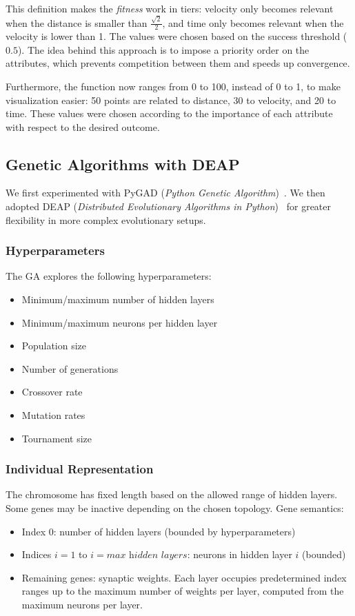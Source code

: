 \documentclass[12pt]{article}
\theoremstyle{definition}
\begin{document}
This definition makes the \textit{fitness} work in tiers: velocity only becomes relevant when the distance is smaller than $\frac{\sqrt{2}}{2}$, and time only becomes relevant when the velocity is lower than 1. The values were chosen based on the success threshold ($0.5$). The idea behind this approach is to impose a priority order on the attributes, which prevents competition between them and speeds up convergence.

Furthermore, the function now ranges from 0 to 100, instead of 0 to 1, to make visualization easier: 50 points are related to distance, 30 to velocity, and 20 to time. These values were chosen according to the importance of each attribute with respect to the desired outcome.

\subsection{Genetic Algorithms with DEAP}
We first experimented with PyGAD (\textit{Python Genetic Algorithm})~\cite{DBLP:journals/corr/abs-2106-06158}. We then adopted DEAP (\textit{Distributed Evolutionary Algorithms in Python})~\cite{DEAP_JMLR2012} for greater flexibility in more complex evolutionary setups.

\subsubsection{Hyperparameters}
The GA explores the following hyperparameters:
\begin{itemize}
    \item Minimum/maximum number of hidden layers
    \item Minimum/maximum neurons per hidden layer
    \item Population size
    \item Number of generations
    \item Crossover rate
    \item Mutation rates
    \item Tournament size
\end{itemize}

\subsubsection{Individual Representation}
The chromosome has fixed length based on the allowed range of hidden layers. Some genes may be inactive depending on the chosen topology. Gene semantics:
\begin{itemize}
    \item Index 0: number of hidden layers (bounded by hyperparameters)
    \item Indices $i=1$ to $i=\textit{max hidden layers}$: neurons in hidden layer $i$ (bounded)
    \item Remaining genes: synaptic weights. Each layer occupies predetermined index ranges up to the maximum number of weights per layer, computed from the maximum neurons per layer.
\end{itemize}
\end{document}
